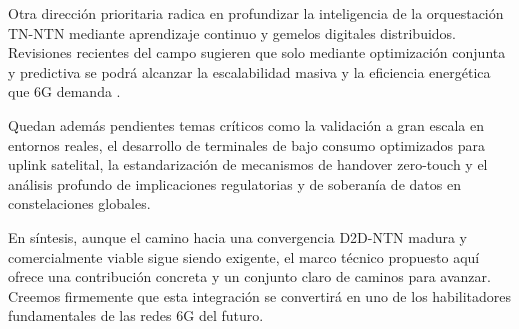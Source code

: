 Otra dirección prioritaria radica en profundizar la inteligencia de la orquestación TN-NTN mediante aprendizaje continuo y gemelos digitales distribuidos. Revisiones recientes del campo sugieren que solo mediante optimización conjunta y predictiva se podrá alcanzar la escalabilidad masiva y la eficiencia energética que 6G demanda \cite{Wang2025_NTN6G}.

Quedan además pendientes temas críticos como la validación a gran escala en entornos reales, el desarrollo de terminales de bajo consumo optimizados para uplink satelital, la estandarización de mecanismos de handover zero-touch y el análisis profundo de implicaciones regulatorias y de soberanía de datos en constelaciones globales.

En síntesis, aunque el camino hacia una convergencia D2D-NTN madura y comercialmente viable sigue siendo exigente, el marco técnico propuesto aquí ofrece una contribución concreta y un conjunto claro de caminos para avanzar. Creemos firmemente que esta integración se convertirá en uno de los habilitadores fundamentales de las redes 6G del futuro.